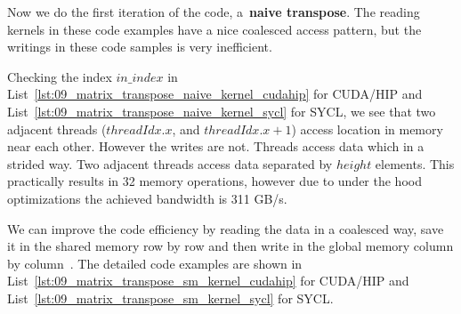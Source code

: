 \par
Now we do the first iteration of the code, a~\textbf{naive transpose}.
The reading kernels in these code examples have a nice coalesced access pattern, but the writings in these code samples is very inefficient.


\par
Checking the index $in\_index$ in List~\ref{lst:09_matrix_transpose_naive_kernel_cudahip} for CUDA/HIP and List~\ref{lst:09_matrix_transpose_naive_kernel_sycl} for SYCL, we see that two adjacent threads ($threadIdx.x$, and $threadIdx.x+1$) access location in memory near each other.
However the writes are not.
Threads access data which in a strided way.
Two adjacent threads access data separated by $height$ elements.
This practically results in 32 memory operations, however due to under the hood optimizations the achieved bandwidth is 311 GB/s.







\par
We can improve the code efficiency by reading the data in a coalesced way, save it in the shared memory row by row and then write in the global memory column by column~\cite{matrix_transpose_efficient, matrix_transpose_advanced}.
The detailed code examples are shown in List~\ref{lst:09_matrix_transpose_sm_kernel_cudahip} for CUDA/HIP and List~\ref{lst:09_matrix_transpose_sm_kernel_sycl} for SYCL.







